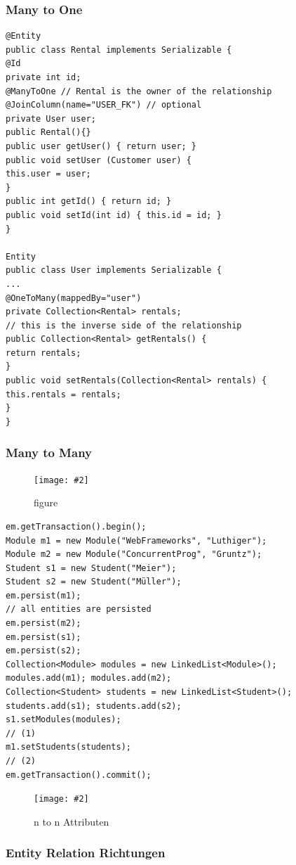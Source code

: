 \documentclass[a4paper,10pt]{scrreprt}
\newcommand{\pic}[2][figure]{\begin{figure}[h]
 \centering
 \texttt{[image: \#2]}
 \caption{#1}
\end{figure}
}
\begin{document}
\subsubsection{Many to One}
\begin{lstlisting}[caption=JPA Many to One Rental - User]
 @Entity
public class Rental implements Serializable {
@Id
private int id;
@ManyToOne // Rental is the owner of the relationship
@JoinColumn(name="USER_FK") // optional
private User user;
public Rental(){}
public user getUser() { return user; }
public void setUser (Customer user) {
this.user = user;
}
public int getId() { return id; }
public void setId(int id) { this.id = id; }
}

Entity
public class User implements Serializable {
...
@OneToMany(mappedBy="user")
private Collection<Rental> rentals;
// this is the inverse side of the relationship
public Collection<Rental> getRentals() {
return rentals;
}
public void setRentals(Collection<Rental> rentals) {
this.rentals = rentals;
}
}
\end{lstlisting}

\subsubsection{Many to Many}
\pic{nton.png}
\begin{lstlisting}[caption=nton Test JPA]
 em.getTransaction().begin();
Module m1 = new Module("WebFrameworks", "Luthiger");
Module m2 = new Module("ConcurrentProg", "Gruntz");
Student s1 = new Student("Meier");
Student s2 = new Student("Müller");
em.persist(m1);
// all entities are persisted
em.persist(m2);
em.persist(s1);
em.persist(s2);
Collection<Module> modules = new LinkedList<Module>();
modules.add(m1); modules.add(m2);
Collection<Student> students = new LinkedList<Student>();
students.add(s1); students.add(s2);
s1.setModules(modules);
// (1)
m1.setStudents(students);
// (2)
em.getTransaction().commit();

\end{lstlisting}

\pic[n to n Attributen]{ntonattr.png}

\subsubsection{Entity Relation Richtungen}
\end{document}
